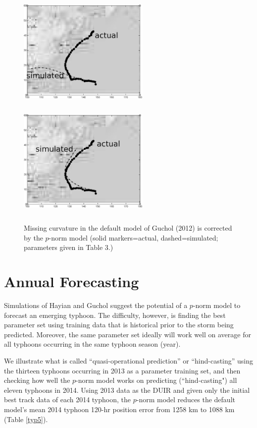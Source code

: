 \documentclass{SBCbookchapter}
\begin{document}
\begin{figure}[h]
\centering
  \includegraphics [width=2.5in, height=2.25in]{GucholTrackDefault.eps}
  \includegraphics[width=2.5in, height=2.25in]{GucholTrackp.eps}
     \caption{Missing curvature in the default model of Guchol (2012) is corrected by the $p$-norm model (solid markers=actual, dashed=simulated; parameters given in Table 3.)}
  \label{gucholfig}
\end{figure}



\section{Annual Forecasting}
     Simulations of Hayian and Guchol suggest the potential of a $p$-norm model to forecast an emerging typhoon. The difficulty, however, is finding the best parameter set using training data that is historical prior to the storm being predicted. Moreover, the same parameter set ideally will work well on average for all typhoons occurring in the same typhoon season (year).

          We illustrate what is called ``quasi-operational prediction'' or ``hind-casting'' using the thirteen typhoons occurring in 2013 as a parameter training set, and then checking how well the $p$-norm model works on predicting (``hind-casting") all eleven typhoons in 2014.  Using 2013 data as the DUIR and given only the initial best track data of each 2014 typhoon,   the $p$-norm model reduces the default model's  mean 2014 typhoon 120-hr position error from 1258 km to 1088 km (Table \ref{typ5}).
\end{document}
